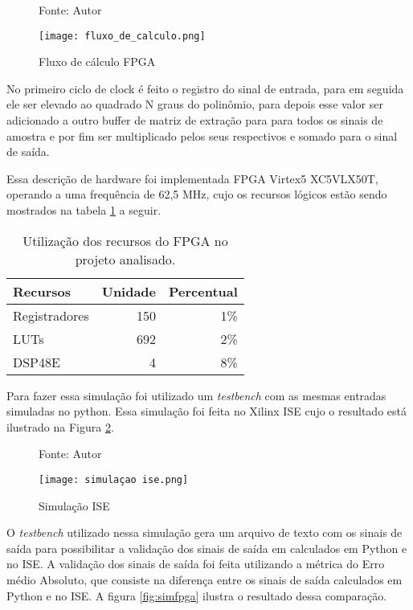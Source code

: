 \begin{figure}[ht!]
	\centering
	\captionsetup{justification=centering}
	\caption*{Fonte: Autor}
	\texttt{[image: fluxo\_de\_calculo.png]}
	\caption{Fluxo de cálculo FPGA}
	\label{fig:fluxocal}
\end{figure}

No primeiro ciclo de clock é feito o registro do sinal de entrada, para em seguida ele ser elevado ao quadrado N graus do polinômio, para depois esse valor ser adicionado a outro buffer de matriz de extração para para todos os sinais de amostra e por fim ser multiplicado pelos seus respectivos e somado para o sinal de saída.

Essa descrição de hardware foi implementada FPGA Virtex5 XC5VLX50T, operando a uma frequência de 62,5 MHz, cujo os recursos lógicos estão sendo mostrados na tabela \ref{tab:recursos_fpga} a seguir.

\begin{table}[h!]
	\centering
	\begin{tabular}{|l|r|r|}
		\hline
		Recursos & Unidade & Percentual \\
		\hline
		Registradores & 150 & 1\% \\
		LUTs & 692 & 2\% \\
		DSP48E & 4 & 8\% \\
		\hline
	\end{tabular}
	\caption{Utilização dos recursos do FPGA no projeto analisado.}
	\label{tab:recursos_fpga}
\end{table}

Para fazer essa simulação foi utilizado um \textit{testbench} com as mesmas entradas simuladas no python. Essa simulação foi feita no Xilinx ISE cujo o resultado está ilustrado na Figura \ref{fig:simise}.

\begin{figure}[ht!]
	\centering
	\captionsetup{justification=centering}
	\caption*{Fonte: Autor}
	\texttt{[image: simulaçao ise.png]}
	\caption{Simulação ISE}
	\label{fig:simise}
\end{figure}

O \textit{testbench} utilizado nessa simulação gera um arquivo de texto com os sinais de saída para possibilitar a validação dos sinais de saída em calculados em Python e no ISE. A validação dos sinais de saída foi feita utilizando a métrica do Erro médio Absoluto, que consiste na diferença entre os sinais de saída calculados em Python e no ISE. A figura \ref{fig:simfpga} ilustra o resultado dessa comparação.



